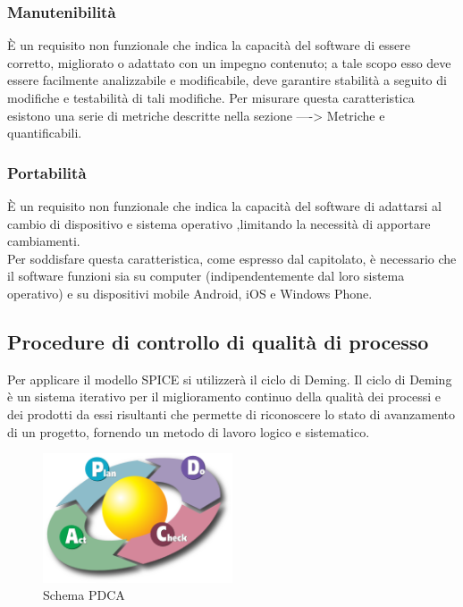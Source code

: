 \subsubsection{Manutenibilità}
È un requisito non funzionale che indica la capacità del software di essere corretto, migliorato o adattato con un impegno contenuto; a tale scopo esso deve essere facilmente analizzabile e modificabile, deve garantire stabilità a seguito di modifiche e testabilità di tali modifiche. 
Per misurare questa caratteristica esistono una serie di metriche descritte nella sezione ----> Metriche e quantificabili.

\subsubsection{Portabilità}
È un requisito non funzionale che indica la capacità del software di adattarsi al cambio di dispositivo e sistema operativo ,limitando la necessità di apportare cambiamenti.\\
Per soddisfare questa caratteristica, come espresso dal capitolato, è necessario che il software funzioni sia su computer (indipendentemente dal loro sistema operativo) e su dispositivi mobile Android, iOS e Windows Phone.

\subsection{Procedure di controllo di qualità di processo}
Per applicare il modello SPICE si utilizzerà il ciclo di Deming. Il ciclo di Deming è un sistema iterativo per il miglioramento continuo della qualità dei processi e dei prodotti da essi risultanti che permette di riconoscere lo stato di avanzamento di un progetto, fornendo un metodo di lavoro logico e sistematico.

\begin{figure}[h]
  \centering
    \includegraphics[width=0.5\textwidth]{./images/deming}
  \caption{Schema PDCA}
  \label{fig:deming}
\end{figure}

